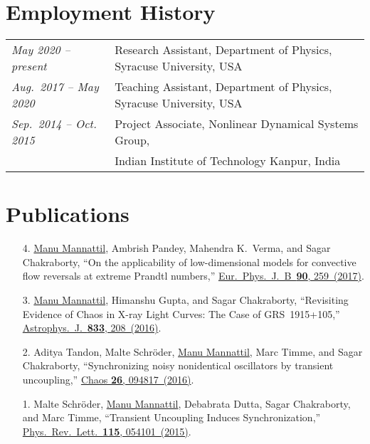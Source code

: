 \documentclass[10pt]{article}
\newcommand{\bname}{\underline{Manu Mannattil}} %
\providecommand{\doi}[2]{\href{https://dx.doi.org/#1}{#2}}
\begin{document}

\section*{Employment History}

\begin{tabular}{@{}ll}
  \emph{May 2020 -- present}     & Research Assistant, Department of Physics, Syracuse University, USA\\
  \emph{Aug.~2017 -- May 2020}   & Teaching Assistant, Department of Physics, Syracuse University, USA\\
  \emph{Sep.~2014 -- Oct. 2015}  & Project Associate, Nonlinear Dynamical Systems Group,\\
                                 & Indian Institute of Technology Kanpur, India
\end{tabular}


\section*{Publications}


\begin{enumerate}[itemsep=0pt,leftmargin=20pt]
  \item[4.] \bname, Ambrish Pandey, Mahendra K.~Verma, and Sagar Chakraborty, ``On the applicability of low-dimensional models for convective flow reversals at extreme Prandtl numbers,'' \doi{10.1140/epjb/e2017-80391-1}{Eur.~Phys.~J.~B~\textbf{90}, 259~(2017)}.
  \item[3.] \bname, Himanshu Gupta, and Sagar Chakraborty, ``Revisiting Evidence of Chaos in X-ray Light Curves: The Case of GRS~1915+105,'' \doi{10.3847/1538-4357/833/2/208}{Astrophys.~J.~\textbf{833}, 208~(2016)}.
  \item[2.] Aditya Tandon, Malte Schr\"{o}der, \bname, Marc Timme, and Sagar Chakraborty, ``Synchronizing noisy nonidentical oscillators by transient uncoupling,'' \doi{10.1063/1.4959141}{Chaos \textbf{26}, 094817~(2016)}.
  \item[1.] Malte Schr\"{o}der, \bname, Debabrata Dutta, Sagar Chakraborty, and Marc Timme, ``Transient Uncoupling Induces Synchronization,'' \doi{10.1103/PhysRevLett.115.054101}{Phys.~Rev.~Lett.~\textbf{115}, 054101~(2015)}.
\end{enumerate}
\end{document}
